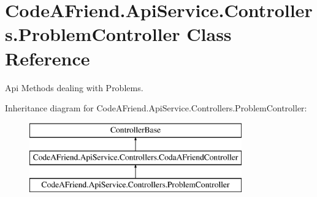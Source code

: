 \hypertarget{class_code_a_friend_1_1_api_service_1_1_controllers_1_1_problem_controller}{}\section{Code\+A\+Friend.\+Api\+Service.\+Controllers.\+Problem\+Controller Class Reference}
\label{class_code_a_friend_1_1_api_service_1_1_controllers_1_1_problem_controller}


Api Methods dealing with Problems.  


Inheritance diagram for Code\+A\+Friend.\+Api\+Service.\+Controllers.\+Problem\+Controller\+:\begin{figure}[H]
\begin{center}
\leavevmode
\includegraphics[height=3.000000cm]{class_code_a_friend_1_1_api_service_1_1_controllers_1_1_problem_controller}
\end{center}
\end{figure}
